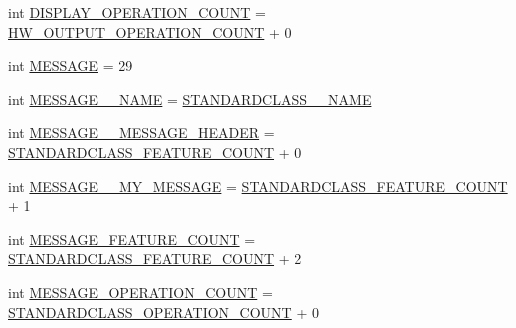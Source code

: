 \begin{DoxyCompactItemize}
\item 
int \hyperlink{interfaceshootingmachineemfmodel_1_1_shootingmachineemfmodel_package_a1b4ff159ceee549b0563fa4a343b65c2}{D\-I\-S\-P\-L\-A\-Y\-\_\-\-O\-P\-E\-R\-A\-T\-I\-O\-N\-\_\-\-C\-O\-U\-N\-T} = \hyperlink{interfaceshootingmachineemfmodel_1_1_shootingmachineemfmodel_package_a911c6904fe8043130ce479d0e1d2e0b6}{H\-W\-\_\-\-O\-U\-T\-P\-U\-T\-\_\-\-O\-P\-E\-R\-A\-T\-I\-O\-N\-\_\-\-C\-O\-U\-N\-T} + 0
\item 
int \hyperlink{interfaceshootingmachineemfmodel_1_1_shootingmachineemfmodel_package_a6cfab10c1d9f4ff2b045b82dabf2fca5}{M\-E\-S\-S\-A\-G\-E} = 29
\item 
int \hyperlink{interfaceshootingmachineemfmodel_1_1_shootingmachineemfmodel_package_a06b089367823068502816e69da5d9962}{M\-E\-S\-S\-A\-G\-E\-\_\-\-\_\-\-N\-A\-M\-E} = \hyperlink{interfaceshootingmachineemfmodel_1_1_shootingmachineemfmodel_package_a06475d7d54d52ee19b2aaf4d5d73c738}{S\-T\-A\-N\-D\-A\-R\-D\-C\-L\-A\-S\-S\-\_\-\-\_\-\-N\-A\-M\-E}
\item 
int \hyperlink{interfaceshootingmachineemfmodel_1_1_shootingmachineemfmodel_package_a128890f7aa05acf3d43a605af26d154b}{M\-E\-S\-S\-A\-G\-E\-\_\-\-\_\-\-M\-E\-S\-S\-A\-G\-E\-\_\-\-H\-E\-A\-D\-E\-R} = \hyperlink{interfaceshootingmachineemfmodel_1_1_shootingmachineemfmodel_package_a14037f66989b3107e402142df96ee9aa}{S\-T\-A\-N\-D\-A\-R\-D\-C\-L\-A\-S\-S\-\_\-\-F\-E\-A\-T\-U\-R\-E\-\_\-\-C\-O\-U\-N\-T} + 0
\item 
int \hyperlink{interfaceshootingmachineemfmodel_1_1_shootingmachineemfmodel_package_a73a9b27935f74a04999cbd904026a86f}{M\-E\-S\-S\-A\-G\-E\-\_\-\-\_\-\-M\-Y\-\_\-\-M\-E\-S\-S\-A\-G\-E} = \hyperlink{interfaceshootingmachineemfmodel_1_1_shootingmachineemfmodel_package_a14037f66989b3107e402142df96ee9aa}{S\-T\-A\-N\-D\-A\-R\-D\-C\-L\-A\-S\-S\-\_\-\-F\-E\-A\-T\-U\-R\-E\-\_\-\-C\-O\-U\-N\-T} + 1
\item 
int \hyperlink{interfaceshootingmachineemfmodel_1_1_shootingmachineemfmodel_package_aebbfc790024953cdc7c3f7d721c99cfc}{M\-E\-S\-S\-A\-G\-E\-\_\-\-F\-E\-A\-T\-U\-R\-E\-\_\-\-C\-O\-U\-N\-T} = \hyperlink{interfaceshootingmachineemfmodel_1_1_shootingmachineemfmodel_package_a14037f66989b3107e402142df96ee9aa}{S\-T\-A\-N\-D\-A\-R\-D\-C\-L\-A\-S\-S\-\_\-\-F\-E\-A\-T\-U\-R\-E\-\_\-\-C\-O\-U\-N\-T} + 2
\item 
int \hyperlink{interfaceshootingmachineemfmodel_1_1_shootingmachineemfmodel_package_a6326f815e736e221ea20b98e0ccf391b}{M\-E\-S\-S\-A\-G\-E\-\_\-\-O\-P\-E\-R\-A\-T\-I\-O\-N\-\_\-\-C\-O\-U\-N\-T} = \hyperlink{interfaceshootingmachineemfmodel_1_1_shootingmachineemfmodel_package_a2fe5d848cfe0a02fe5609e2c5ed7e7c7}{S\-T\-A\-N\-D\-A\-R\-D\-C\-L\-A\-S\-S\-\_\-\-O\-P\-E\-R\-A\-T\-I\-O\-N\-\_\-\-C\-O\-U\-N\-T} + 0
\end{DoxyCompactItemize}


